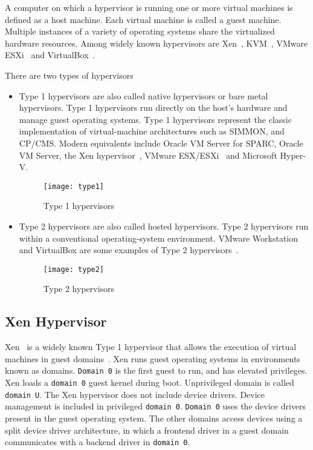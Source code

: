 A computer on which a hypervisor is running one or more virtual machines is defined as a host machine. Each virtual machine is called a guest machine. Multiple instances of a variety of operating systems share the virtualized hardware resources. Among widely known hypervisors are Xen~\cite{barham2003xen, Chisnall:2007:DGX:1407351}, KVM~\cite{Habib:2008:VK:1344209.1344217, kivity2007kvm}, VMware ESXi~\cite{Agesen:2010:EXV:1899928.1899930} and VirtualBox~\cite{camargos2008virtualization}.

There are two types of hypervisors~\cite{Popek:1974:FRV:361011.361073}
\begin{itemize}
\item Type 1 hypervisors are also called native hypervisors or bare metal hypervisors. Type 1 hypervisors run directly on the host's hardware and manage guest operating systems. Type 1 hypervisors represent the classic implementation of virtual-machine architectures such as SIMMON, and CP/CMS. Modern equivalents include Oracle VM Server for SPARC, Oracle VM Server, the Xen hypervisor~\cite{barham2003xen}, VMware ESX/ESXi~\cite{Agesen:2010:EXV:1899928.1899930} and Microsoft Hyper-V.
\begin{figure}[!ht]
\centering
\texttt{[image: type1]}
\caption{Type 1 hypervisors}
\label{Type 1 hypervisor}
\end{figure}
\item Type 2 hypervisors are also called hosted hypervisors. Type 2 hypervisors run within a conventional operating-system environment. VMware Workstation and VirtualBox are some examples of Type 2 hypervisors~\cite{Sugerman:2001:VID:647055.715774, camargos2008virtualization}.
\begin{figure}[!ht]
\centering
\texttt{[image: type2]}
\caption{Type 2 hypervisors}
\label{fig:Type 2 hypervisor}
\end{figure}
\end{itemize}

\subsection{Xen Hypervisor}
Xen~\cite{barham2003xen} is a widely known Type 1 hypervisor that allows the execution of virtual machines in guest domains~\cite{king2003operating}. Xen runs guest operating systems in environments known as domains. \texttt{Domain 0} is the first guest to run, and has elevated privileges. Xen loads a \texttt{domain 0} guest kernel during boot. Unprivileged domain is called \texttt{domain U}. The Xen hypervisor does not include device drivers. Device management is included in privileged \texttt{domain 0}. \texttt{Domain 0} uses the device drivers present in the guest operating system. The other domains access devices using a split device driver architecture, in which a frontend driver in a guest domain communicates with a backend driver in \texttt{domain 0}.

